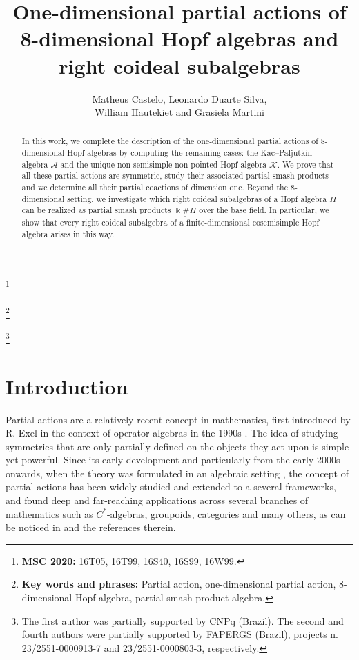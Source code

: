 \documentclass[reqno]{amsart}
\title[Partial actions of 8-dimensional Hopf algebras]{One-dimensional partial actions of 8-dimensional Hopf algebras and right coideal subalgebras}
\author[M. Castelo, L. Duarte Silva, W. Hautekiet and G. Martini]{Matheus Castelo, Leonardo Duarte Silva, \\ William Hautekiet and Grasiela Martini}
\theoremstyle{definition}
\numberwithin{equation}{section}\theoremstyle{plain}
\theoremstyle{definition}
\begin{document}
\allowdisplaybreaks

\begin{abstract}    
     In this work, we complete the description of the one-dimensional partial actions of 8-dimensional Hopf algebras by computing the remaining cases: the Kac–Paljutkin algebra  $\mathcal{A}$ and the unique non-semisimple non-pointed Hopf algebra $\mathcal{K}$. 
     We prove that all these partial actions are symmetric, study their associated partial smash products and we determine all their partial coactions of dimension one.
     Beyond the 8-dimensional setting, we investigate which right coideal subalgebras of a Hopf algebra $H$ can be realized as partial smash products $\underline{\Bbbk\#H}$ over the base field.
     In particular, we show that every right coideal subalgebra of a finite-dimensional cosemisimple Hopf algebra arises in this way.
\end{abstract}


\thanks{{\bf MSC 2020:} 16T05, 16T99, 16S40, 16S99,   16W99.}

\thanks{{\bf Key words and phrases:} Partial action, one-dimensional partial action, 8-dimensional Hopf algebra, partial smash product algebra.}

\thanks{The first author was partially supported by CNPq (Brazil). The second and fourth authors were partially supported by FAPERGS (Brazil), projects n. 23/2551-0000913-7 and 23/2551-0000803-3, respectively.}


\maketitle

\tableofcontents


\section{Introduction}
Partial actions are a relatively recent concept in mathematics, first introduced by R. Exel in the context of operator algebras in the 1990s \cite{exel1994circle}.
The idea of studying symmetries that are only partially defined on the objects they act upon is simple yet powerful.
Since its early development and particularly from the early 2000s onwards, when the theory was formulated in an algebraic setting \cite{Dokuchaev_exel}, the concept of partial actions has been widely studied and extended to a several frameworks, and found deep and far-reaching applications across several branches of mathematics such as $C^\ast$-algebras, groupoids, categories and many others, as can be noticed in \cite{Dokuchaev_survey} and the references therein.
\end{document}
